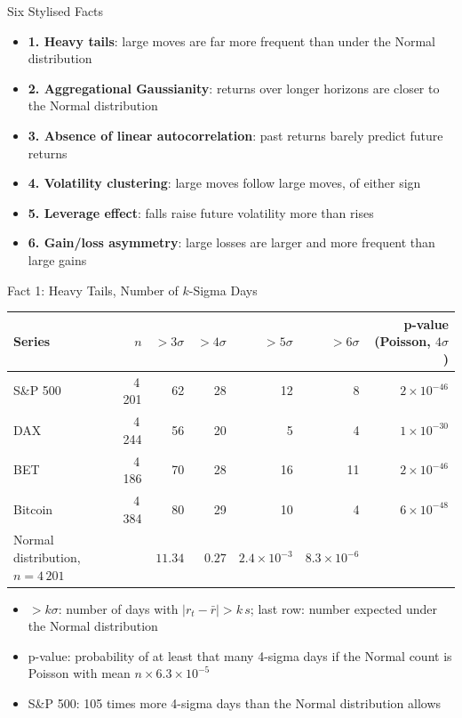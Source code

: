 \begin{frame}{Six Stylised Facts}
\itemsize{\small}
\begin{itemize}
    \item \textbf{1. Heavy tails}: large moves are far more frequent than under the Normal distribution
    \item \textbf{2. Aggregational Gaussianity}: returns over longer horizons are closer to the Normal distribution
    \item \textbf{3. Absence of linear autocorrelation}: past returns barely predict future returns
    \item \textbf{4. Volatility clustering}: large moves follow large moves, of either sign
    \item \textbf{5. Leverage effect}: falls raise future volatility more than rises
    \item \textbf{6. Gain/loss asymmetry}: large losses are larger and more frequent than large gains
\end{itemize}
\end{frame}

\begin{frame}{Fact 1: Heavy Tails, Number of $k$-Sigma Days}
\itemsize{\footnotesize}
\begin{center}
\footnotesize
\begin{tabular}{lrrrrrr}
\toprule
Series & $n$ & $>3\sigma$ & $>4\sigma$ & $>5\sigma$ & $>6\sigma$ & p-value (Poisson, $4\sigma$) \\
\midrule
S\&P 500 & 4\,201 & 62 & 28 & 12 & 8 & ${2 \times 10^{-46}}$ \\
DAX & 4\,244 & 56 & 20 & 5 & 4 & ${1 \times 10^{-30}}$ \\
BET & 4\,186 & 70 & 28 & 16 & 11 & ${2 \times 10^{-46}}$ \\
Bitcoin & 4\,384 & 80 & 29 & 10 & 4 & ${6 \times 10^{-48}}$ \\
Normal distribution, $n = 4\,201$ & & $11.34$ & $0.27$ & $2.4 \times 10^{-3}$ & $8.3 \times 10^{-6}$ &  \\
\bottomrule
\end{tabular}
\end{center}
\begin{itemize}
    \item $>k\sigma$: number of days with $|r_t - \bar r| > k\,s$; last row: number expected under the Normal distribution
    \item p-value: probability of at least that many 4-sigma days if the Normal count is Poisson with mean $n \times 6.3 \times 10^{-5}$
    \item S\&P 500: 105 times more 4-sigma days than the Normal distribution allows
\end{itemize}
\end{frame}

